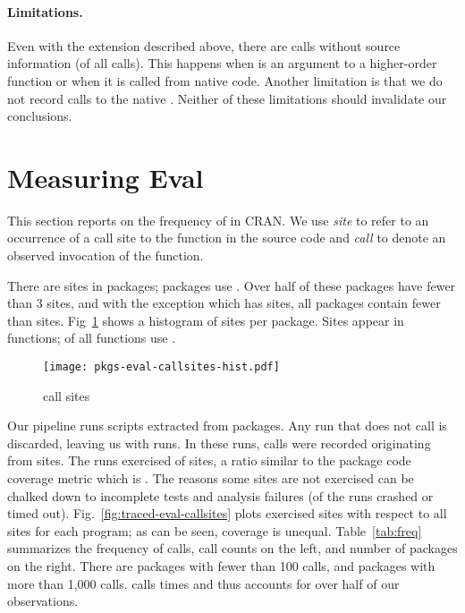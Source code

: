\documentclass[acmsmall, screen]{acmart}
\begin{document}
\paragraph{Limitations.} Even with the extension described above, there are
\PkgUndefinedRnd \eval calls without source information (\PkgUndefinedRatio of
all \eval calls). This happens when \eval is an argument to a higher-order
function or when it is called from native code. Another limitation is that we do
not record calls to the native \eval. Neither of these limitations should
invalidate our conclusions.

\section{Measuring Eval}

This section reports on the frequency of \eval in CRAN. We use \emph{site} to
refer to an occurrence of a call site to the \eval function in the source code
and \emph{call} to denote an observed invocation of the \eval function.

There are \PkgEvalCallSites \eval sites in \PkgPackages packages;
\PkgPackagesRatio packages use \eval. Over half of these packages have fewer
than 3 sites, and with the exception \MaxEvalCallSitesPackage which has
\MaxEvalCallSitesCount sites, all packages contain fewer than
\MaxEvalCallSitesRest sites. Fig~\ref{fig:pkgs-eval-callsites-hist} shows a
histogram of sites per package. Sites appear in \PkgFunsWithEval functions;
\CranFunsWithEvalRatio of all functions use \eval.

\begin{figure}[!h]
   \texttt{[image: pkgs-eval-callsites-hist.pdf]}
  \caption{ \eval call sites}\label{fig:pkgs-eval-callsites-hist}
\end{figure}

Our pipeline runs \CranRunnableScripts scripts extracted from \CranPackages
packages. Any run that does not call \eval is discarded, leaving us with
\packageNbruns runs. In these runs, \packageAllcalls \eval calls were recorded
originating from \PkgHitEvalCallSites sites. The runs exercised
\PkgHitEvalCallSitesAvgRatio of sites, a ratio similar to the package code
coverage metric which is \PkgCodeCoverage. The reasons some sites are not
exercised can be chalked down to incomplete tests and analysis failures
(\PkgFailedProgramsRatio of the runs crashed or timed out).
Fig.~\ref{fig:traced-eval-callsites} plots exercised sites with respect to all
sites for each program; as can be seen, coverage is unequal.
Table~\ref{tab:freq} summarizes the frequency of calls, call counts on the left, and
number of packages on the right. There are \packageFewcalls packages with fewer
than 100 calls, and \packageManycalls packages with more than 1,000 calls.
\packageMaxcallspack calls \eval \packageMaxcalls times and thus accounts for
over half of our observations.
\end{document}
